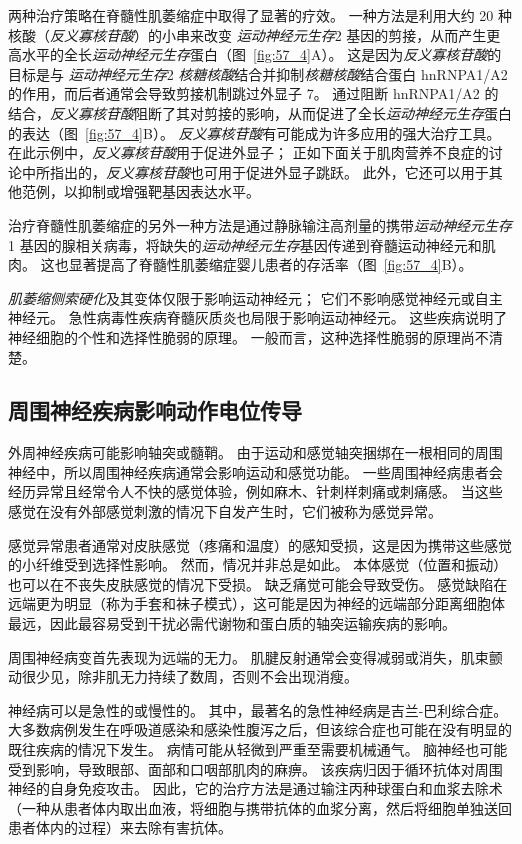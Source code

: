两种治疗策略在脊髓性肌萎缩症中取得了显著的疗效。
一种方法是利用大约 20 种核酸（\textit{反义寡核苷酸}）的小串来改变 \textit{运动神经元生存}2 基因的剪接，从而产生更高水平的全长\textit{运动神经元生存}蛋白（图~\ref{fig:57_4}A）。
这是因为\textit{反义寡核苷酸}的目标是与 \textit{运动神经元生存}2 \textit{核糖核酸}结合并抑制\textit{核糖核酸}结合蛋白 hnRNPA1/A2 的作用，而后者通常会导致剪接机制跳过外显子 7。
通过阻断 hnRNPA1/A2 的结合，\textit{反义寡核苷酸}阻断了其对剪接的影响，从而促进了全长\textit{运动神经元生存}蛋白的表达（图~\ref{fig:57_4}B）。
\textit{反义寡核苷酸}有可能成为许多应用的强大治疗工具。
在此示例中，\textit{反义寡核苷酸}用于促进外显子；
正如下面关于肌肉营养不良症的讨论中所指出的，\textit{反义寡核苷酸}也可用于促进外显子跳跃。
此外，它还可以用于其他范例，以抑制或增强靶基因表达水平。


治疗脊髓性肌萎缩症的另外一种方法是通过静脉输注高剂量的携带\textit{运动神经元生存}1 基因的腺相关病毒，将缺失的\textit{运动神经元生存}基因传递到脊髓运动神经元和肌肉。
这也显著提高了脊髓性肌萎缩症婴儿患者的存活率（图~\ref{fig:57_4}B）。


\textit{肌萎缩侧索硬化}及其变体仅限于影响运动神经元；
它们不影响感觉神经元或自主神经元。
急性病毒性疾病脊髓灰质炎也局限于影响运动神经元。
这些疾病说明了神经细胞的个性和选择性脆弱的原理。
一般而言，这种选择性脆弱的原理尚不清楚。



\subsection{周围神经疾病影响动作电位传导}

外周神经疾病可能影响轴突或髓鞘。
由于运动和感觉轴突捆绑在一根相同的周围神经中，所以周围神经疾病通常会影响运动和感觉功能。
一些周围神经病患者会经历异常且经常令人不快的感觉体验，例如麻木、针刺样刺痛或刺痛感。
当这些感觉在没有外部感觉刺激的情况下自发产生时，它们被称为感觉异常。


感觉异常患者通常对皮肤感觉（疼痛和温度）的感知受损，这是因为携带这些感觉的小纤维受到选择性影响。 然而，情况并非总是如此。
本体感觉（位置和振动）也可以在不丧失皮肤感觉的情况下受损。 缺乏痛觉可能会导致受伤。
感觉缺陷在远端更为明显（称为手套和袜子模式），这可能是因为神经的远端部分距离细胞体最远，因此最容易受到干扰必需代谢物和蛋白质的轴突运输疾病的影响。


周围神经病变首先表现为远端的无力。
肌腱反射通常会变得减弱或消失，肌束颤动很少见，除非肌无力持续了数周，否则不会出现消瘦。


神经病可以是急性的或慢性的。
其中，最著名的急性神经病是吉兰-巴利综合症。
大多数病例发生在呼吸道感染和感染性腹泻之后，但该综合症也可能在没有明显的既往疾病的情况下发生。
病情可能从轻微到严重至需要机械通气。
脑神经也可能受到影响，导致眼部、面部和口咽部肌肉的麻痹。
该疾病归因于循环抗体对周围神经的自身免疫攻击。
因此，它的治疗方法是通过输注丙种球蛋白和血浆去除术（一种从患者体内取出血液，将细胞与携带抗体的血浆分离，然后将细胞单独送回患者体内的过程）来去除有害抗体。


